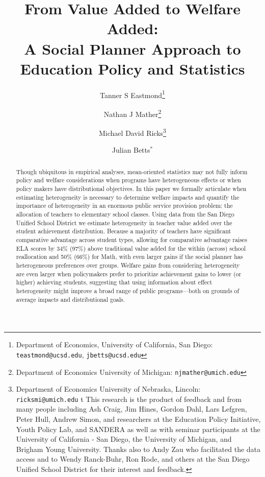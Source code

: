 \documentclass[12pt]{article}
\title{From Value Added to Welfare Added: \\ A Social Planner Approach to Education Policy and Statistics}
\author{Tanner S Eastmond\thanks{Department of Economics, University of California, San Diego: \texttt{teastmond@ucsd.edu}, \texttt{jbetts@ucsd.edu}} \and Nathan J Mather\thanks{Department of Economics University of Michigan: \texttt{njmather@umich.edu}} \and Michael David Ricks\thanks{Department of Economics University of Nebraska, Lincoln: \texttt{ricksmi@umich.edu} \hspace{11em} {\color{white}t} This research is the product of feedback and from many people including Ash Craig, Jim Hines, Gordon Dahl, Lars Lefgren, Peter Hull, %
Andrew Simon, and  researchers at the Education Policy Initiative, Youth Policy Lab, and SANDERA as well as with seminar participants at the University of California - San Diego, the University of Michigan, and Brigham Young University. Thanks also to Andy Zau who facilitated the data access and to  Wendy Ranck-Buhr, Ron Rode, and others at the San Diego Unified School District for their interest and feedback.} \and Julian Betts$^*$}
\theoremstyle{definition}
\theoremstyle{definition}
\theoremstyle{definition}
\theoremstyle{definition}
\begin{document}
\maketitle

\begin{abstract}

Though ubiquitous in empirical analyses, mean-oriented statistics may not fully inform policy and welfare considerations when programs have heterogeneous effects or when policy makers have distributional objectives. In this paper we formally articulate when estimating heterogeneity is necessary to determine welfare impacts and  quantify the importance of heterogeneity in an enormous public service provision problem: the allocation of teachers to elementary school classes. Using data from the San Diego Unified School District we estimate heterogeneity in teacher value added over the student achievement distribution. Because a majority of teachers have significant comparative advantage across student types, allowing for comparative advantage raises ELA scores by 34\% (97\%) above traditional value added for the within (across) school reallocation and 50\% (66\%) for Math, with even larger gains if the social planner has heterogeneous preferences over groups. Welfare gains from considering heterogeneity are even larger when policymakers prefer to prioritize achievement gains to lower (or higher) achieving students, suggesting that using information about effect heterogeneity might improve a broad range of public programs---both on grounds of average impacts and distributional goals.





\end{abstract}
\end{document}
